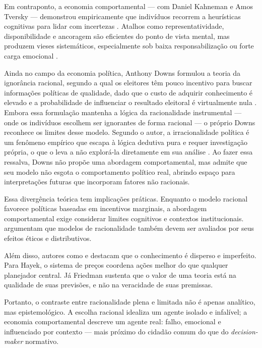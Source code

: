 Em contraponto, a economia comportamental — com Daniel Kahneman e Amos Tversky — demonstrou empiricamente que indivíduos recorrem a heurísticas cognitivas para lidar com incertezas \cite{Judgment_under_Uncertainty}. Atalhos como representatividade, disponibilidade e ancoragem são eficientes do ponto de vista mental, mas produzem vieses sistemáticos, especialmente sob baixa responsabilização ou forte carga emocional \cite{kahneman2011thinking}.

Ainda no campo da economia política, Anthony Downs formulou a teoria da ignorância racional, segundo a qual os eleitores têm pouco incentivo para buscar informações políticas de qualidade, dado que o custo de adquirir conhecimento é elevado e a probabilidade de influenciar o resultado eleitoral é virtualmente nula \cite{downs1957economic}. Embora essa formulação mantenha a lógica da racionalidade instrumental — onde os indivíduos escolhem ser ignorantes de forma racional — o próprio Downs reconhece os limites desse modelo. Segundo o autor, a irracionalidade política é um fenômeno empírico que escapa à lógica dedutiva pura e requer investigação própria, o que o leva a não explorá-la diretamente em sua análise \cite[p.~10]{downs1957economic}. Ao fazer essa ressalva, Downs não propõe uma abordagem comportamental, mas admite que seu modelo não esgota o comportamento político real, abrindo espaço para interpretações futuras que incorporam fatores não racionais.

Essa divergência teórica tem implicações práticas. Enquanto o modelo racional favorece políticas baseadas em incentivos marginais, a abordagem comportamental exige considerar limites cognitivos e contextos institucionais.  argumentam que modelos de racionalidade também devem ser avaliados por seus efeitos éticos e distributivos.

Além disso, autores como  e  destacam que o conhecimento é disperso e imperfeito. Para Hayek, o sistema de preços coordena ações melhor do que qualquer planejador central. Já Friedman sustenta que o valor de uma teoria está na qualidade de suas previsões, e não na veracidade de suas premissas.

Portanto, o contraste entre racionalidade plena e limitada não é apenas analítico, mas epistemológico. A escolha racional idealiza um agente isolado e infalível; a economia comportamental descreve um agente real: falho, emocional e influenciado por contexto — mais próximo do cidadão comum do que do \textit{decision-maker} normativo.

